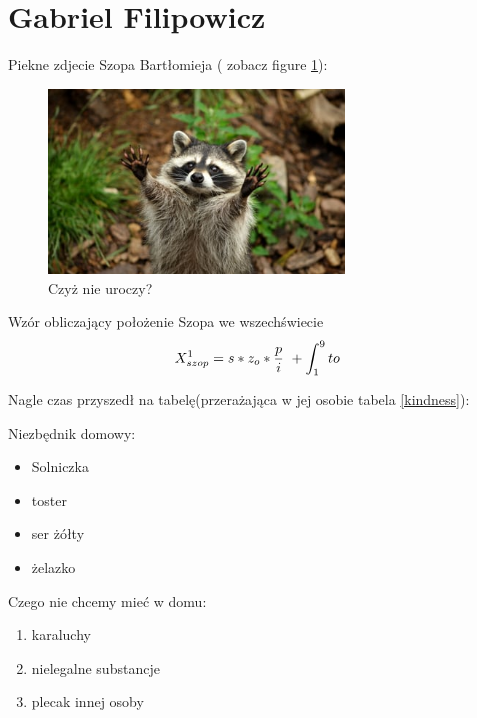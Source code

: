\section{Gabriel Filipowicz}

Piekne zdjecie Szopa Bartłomieja ( zobacz figure \ref{Pracz}):

\begin{figure}[h]
\centering
\includegraphics[width=0.7\textwidth]{pictures/szopito.jpg}
\caption{Czyż nie uroczy?}
\label{Pracz}
\end{figure}

\centering  Wzór obliczający położenie Szopa we wszechświecie
\begin{equation}
\centering
X^{1}_{szop} = s*z_{o}*\frac{p}{i}\ + \int_1^9 to \ 
\end{equation}

Nagle czas przyszedł na tabelę(przerażająca w jej osobie tabela \ref{kindness}):



\vspace{2cm}

Niezbędnik domowy:

\begin{itemize}
    \item Solniczka
    \item toster 
    \item ser żółty 
    \item żelazko 
\end{itemize}

Czego nie chcemy mieć w domu:

\begin{enumerate}
    \item karaluchy
    \item nielegalne substancje
    \item plecak innej osoby
\end{enumerate}
\vspace{2cm}

